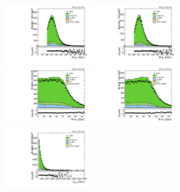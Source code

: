 \begin{figure}[htbp]
  \centering
  \includegraphics[width=0.4\textwidth]{fig/controlPlots/CR_b1_mu_allP_allC_allD_Run2_lnujj_l1_pt.pdf}
  \includegraphics[width=0.4\textwidth]{fig/controlPlots/CR_b1_e_allP_allC_allD_Run2_lnujj_l1_pt.pdf}\\
  \includegraphics[width=0.4\textwidth]{fig/controlPlots/CR_b1_mu_allP_allC_allD_Run2_lnujj_l1_mt.pdf}
  \includegraphics[width=0.4\textwidth]{fig/controlPlots/CR_b1_e_allP_allC_allD_Run2_lnujj_l1_mt.pdf}\\
  \includegraphics[width=0.4\textwidth]{fig/controlPlots/CR_b1_mu_allP_allC_allD_Run2_mWV.pdf}

\end{figure}
